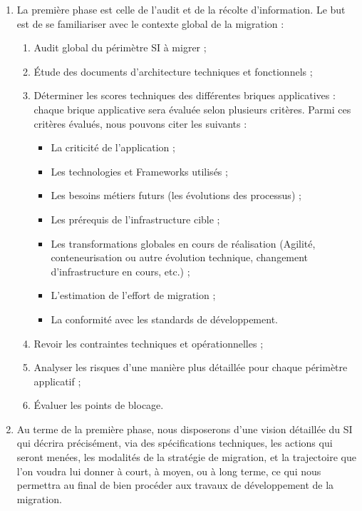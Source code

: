 \begin{enumerate}
    \item La première phase est celle de l’audit et de la récolte d’information. Le but est de se familiariser avec le contexte global de la migration :
    \begin{enumerate}
        \item Audit global du périmètre SI à migrer ;
        \item Étude des documents d’architecture techniques et fonctionnels ;
        \item Déterminer les scores techniques des différentes briques applicatives : chaque brique applicative sera évaluée selon plusieurs critères. Parmi ces critères évalués, nous pouvons citer les suivants :
        \begin{itemize}
            \item La criticité de l’application ;
            \item Les technologies et Frameworks utilisés ;
            \item Les besoins métiers futurs (les évolutions des processus) ;
            \item Les prérequis de l’infrastructure cible ;
            \item Les transformations globales en cours de réalisation (Agilité, conteneurisation ou autre évolution technique, changement d’infrastructure en cours, etc.) ;
            \item L’estimation de l’effort de migration ;
            \item La conformité avec les standards de développement.
        \end{itemize}
        \item Revoir les contraintes techniques et opérationnelles ;
        \item Analyser les risques d’une manière plus détaillée pour chaque périmètre applicatif ;
        \item Évaluer les points de blocage.
    \end{enumerate}
    \item Au terme de la première phase, nous disposerons d'une vision détaillée du SI qui décrira précisément, via des spécifications techniques, les actions qui seront menées, les modalités de la stratégie de migration, et la trajectoire que l’on voudra lui donner à court, à moyen, ou à long terme, ce qui nous permettra au final de bien procéder aux travaux de développement de la migration.
\end{enumerate}
